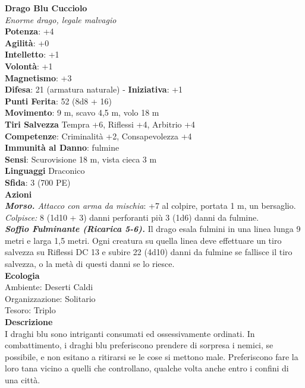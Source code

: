 \begin{multicols}{2}
\medskip\textbf{Drago Blu Cucciolo}\\
\emph{Enorme drago, legale malvagio}\\
\textbf{Potenza}: +4\\
\textbf{Agilità}: +0\\
\textbf{Intelletto}: +1\\
\textbf{Volontà}: +1\\
\textbf{Magnetismo}: +3\\
\textbf{Difesa}: 21 (armatura naturale) - \textbf{Iniziativa}: +1\\
\textbf{Punti Ferita}: 52 (8d8 + 16)\\
\textbf{Movimento}: 9 m, scavo 4,5 m, volo 18 m\\
\textbf{Tiri Salvezza} Tempra +6, Riflessi +4, Arbitrio +4\\
\textbf{Competenze}: Criminalità +2, Consapevolezza +4\\
\textbf{Immunità al Danno}: fulmine\\
\textbf{Sensi}: Scurovisione 18 m, vista cieca 3 m\\
\textbf{Linguaggi} Draconico\\
\textbf{Sfida}: 3 (700 PE)\smallskip\\
\smallskip\textbf{Azioni}\\
\emph{\textbf{Morso.} Attacco con arma da mischia}: +7 al colpire, portata 1 m, un bersaglio.\\
\emph{Colpisce:} 8 (1d10 + 3) danni perforanti più 3 (1d6) danni da fulmine.\\
\emph{\textbf{Soffio Fulminante (Ricarica 5-6).}} Il drago esala fulmini in una linea lunga 9 metri e larga 1,5 metri. Ogni creatura su quella linea deve effettuare un tiro salvezza su Riflessi DC  13 e subire 22 (4d10) danni da fulmine se fallisce il tiro salvezza, o la metà di questi danni se lo riesce.\\
\textbf{Ecologia}\\
Ambiente: Deserti Caldi\\
Organizzazione: Solitario\\
Tesoro: Triplo\\
\textbf{Descrizione}\\
I draghi blu sono intriganti consumati ed ossessivamente ordinati. In combattimento, i draghi blu preferiscono prendere di sorpresa i nemici, se possibile, e non esitano a ritirarsi se le cose si mettono male. Preferiscono fare la loro tana vicino a quelli che controllano, qualche volta anche entro i confini di una città.\\



\end{multicols}
